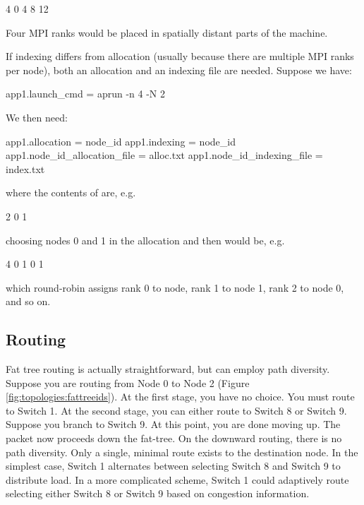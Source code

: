 \begin{ViFile}
4
0
4
8
12
\end{ViFile}
Four MPI ranks would be placed in spatially distant parts of the machine.

If indexing differs from allocation (usually because there are multiple MPI ranks per node), both an allocation and an indexing file are needed.
Suppose we have:

\begin{ViFile}
app1.launch_cmd = aprun -n 4 -N 2
\end{ViFile}
We then need:

\begin{ViFile}
app1.allocation = node_id
app1.indexing = node_id
app1.node_id_allocation_file = alloc.txt
app1.node_id_indexing_file = index.txt
\end{ViFile}
where the contents of  are, e.g.

\begin{ViFile}
2
0
1
\end{ViFile}
choosing nodes 0 and 1 in the allocation and then  would be, e.g.

\begin{ViFile}
4
0
1
0
1
\end{ViFile}
which round-robin assigns rank 0 to node, rank 1 to node 1, rank 2 to node 0, and so on.

\subsection{Routing}
\label{subsec:fattree:routing}

Fat tree routing is actually straightforward, but can employ path diversity.
Suppose you are routing from Node 0 to Node 2 (Figure \ref{fig:topologies:fattreeids}).
At the first stage, you have no choice.
You must route to Switch 1.
At the second stage, you can either route to Switch 8 or Switch 9.
Suppose you branch to Switch 9. 
At this point, you are done moving up.
The packet now proceeds down the fat-tree.
On the downward routing, there is no path diversity.
Only a single, minimal route exists to the destination node.
In the simplest case, Switch 1 alternates between selecting Switch 8 and Switch 9 to distribute load.
In a more complicated scheme, Switch 1 could adaptively route selecting either Switch 8 or Switch 9 based on congestion information.
